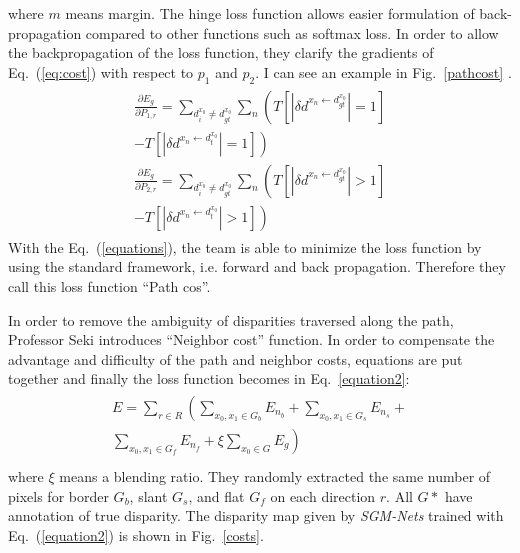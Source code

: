 \documentclass[twocolumn]{article}
\begin{document}
    where $m$ means margin. The hinge loss function allows easier formulation of back-propagation compared to other functions such as softmax loss. In order to allow the backpropagation of the loss function, they clarify the gradients of Eq.~(\ref{eq:cost}) with respect to $p_1$ and $p_2$. I can see an example in Fig.~\ref{pathcost} .
\begin{equation}
\begin{aligned}
\begin{split}
\frac{\partial E_g}{\partial P_{1,r}} =\sum_{d_i^{x_0}\ne d_{gt}^{x_0}}\sum_{n} \left(T\left[\left|\delta d^{x_n\gets d_{gt}^{x_0} }\right|=1\right] \right.\\ \left. -T\left[ \left|\delta d^{x_n\gets d_{t}^{x_0}}\right|=1\right] \right)\\
\frac{\partial E_g}{\partial P_{2,r}} =\sum_{d_i^{x_0}\ne d_{gt}^{x_0}}\sum_{n} \left(T\left[\left|\delta d^{x_n\gets d_{gt}^{x_0} }\right|>1\right] \right.\\ \left. -T\left[ \left|\delta d^{x_n\gets d_{t}^{x_0}}\right|>1\right] \right)
\end{split} \label{equations}
\end{aligned}
\end{equation}
    With the Eq.~(\ref{equations}), the team is able to minimize the loss function by using the standard framework, i.e. forward and back propagation. Therefore they call this loss function ``Path cos''.
    
    In order to remove the ambiguity of disparities traversed along the path, Professor Seki introduces ``Neighbor cost'' function. In order to compensate the advantage and difficulty of the path and neighbor costs, equations are put together and finally the loss function becomes in Eq.~\ref{equation2}:
\begin{equation}
\begin{aligned}
\begin{split}
E =\sum_{r \in R}\left(\sum_{{x_0,x_1} \in G_b} E_{n_b} + \sum_{{x_0,x_1} \in G_s} E_{n_s} +  \right.\\ 
\left. \sum_{{x_0,x_1} \in G_f} E_{n_f} + \xi \sum_{x_0 \in G} E_g \right)\\
\end{split} \label{equation2}
\end{aligned}
\end{equation}    
    where $\xi$ means a blending ratio. They randomly extracted the same number of pixels for border $G_b$, slant $G_s$, and flat $G_f$ on each direction $r$. All $G*$ have annotation of true disparity. The disparity map given by \emph{SGM-Nets} trained with Eq.~(\ref{equation2}) is shown in Fig.~\ref{costs}.
    
\end{document}
